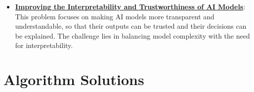 \documentclass{article}%
\begin{document}
\begin{itemize}[leftmargin=*]
\item \href{https://purdue.brightspace.com/d2l/common/assets/pdfjs-d2l-dist/1.0.14-legacy/web/viewer.html?file=\%2Fcontent\%2Fenforced\%2F1095467-wl.202510.CS.24300.001\%2F16L2-ethics.pdf\%3Fou\%3D1095467\&lang=en-us\&container=d2l-fileviewer-rendered-pdf\&fullscreen=d2l-fileviewer-rendered-pdf-dialog\&height=667#page=28}{\textbf{Improving the Interpretability and Trustworthiness of AI Models}}: This problem focuses on making AI models more transparent and understandable, so that their outputs can be trusted and their decisions can be explained. The challenge lies in balancing model complexity with the need for interpretability.%
\end{itemize}

%
\section{Algorithm Solutions}%
\label{sec:AlgorithmSolutions}%
\end{document}
